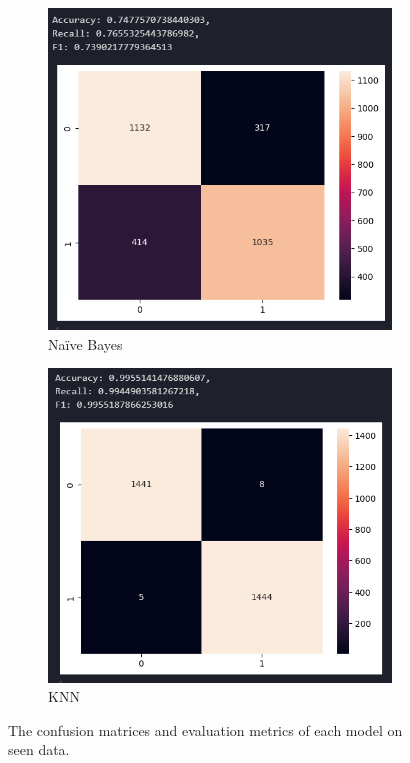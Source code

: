 \documentclass[12pt]{report}
\begin{document}
\begin{figure}[H]
    \begin{subfigure}[b]{0.45\textwidth}
        \includegraphics[width=\textwidth]{ModelDev/Iteration1/Matrices/Seen/MetricsIncluded/NB.png}
        \caption{Na\"ive Bayes}
        \label{fig:NBSeen}
    \end{subfigure}
    \hfill
    \begin{subfigure}[b]{0.45\textwidth}
        \includegraphics[width=\textwidth]{ModelDev/Iteration1/Matrices/Seen/MetricsIncluded/KNN.png}
        \caption{KNN}
        \label{fig:KNNSeen}
    \end{subfigure}
    \caption{The confusion matrices and evaluation metrics of each model on seen data.}
    \label{fig:SeenDataMatrices}
\end{figure}
\end{document}
